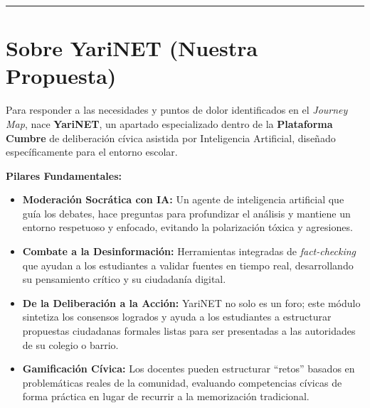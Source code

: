 \documentclass[12pt,a4paper]{article}
\begin{document}
\vspace{0.5cm}
\hrule
\vspace{0.5cm}

\section{Sobre YariNET (Nuestra Propuesta)}

Para responder a las necesidades y puntos de dolor identificados en el \textit{Journey Map}, nace \textbf{YariNET}, un apartado especializado dentro de la \textbf{Plataforma Cumbre} de deliberación cívica asistida por Inteligencia Artificial, diseñado específicamente para el entorno escolar.

\textbf{Pilares Fundamentales:}
\begin{itemize}
    \item \textbf{Moderación Socrática con IA:} Un agente de inteligencia artificial que guía los debates, hace preguntas para profundizar el análisis y mantiene un entorno respetuoso y enfocado, evitando la polarización tóxica y agresiones.
    \item \textbf{Combate a la Desinformación:} Herramientas integradas de \textit{fact-checking} que ayudan a los estudiantes a validar fuentes en tiempo real, desarrollando su pensamiento crítico y su ciudadanía digital.
    \item \textbf{De la Deliberación a la Acción:} YariNET no solo es un foro; este módulo sintetiza los consensos logrados y ayuda a los estudiantes a estructurar propuestas ciudadanas formales listas para ser presentadas a las autoridades de su colegio o barrio.
    \item \textbf{Gamificación Cívica:} Los docentes pueden estructurar ``retos'' basados en problemáticas reales de la comunidad, evaluando competencias cívicas de forma práctica en lugar de recurrir a la memorización tradicional.
\end{itemize}
\end{document}
